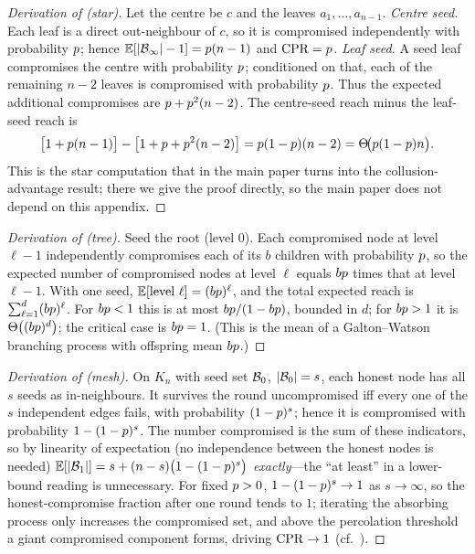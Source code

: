 \begin{proof}[Derivation of  (star)]
Let the centre be $c$ and the leaves $a_1,\dots,a_{n-1}$.
\emph{Centre seed.} Each leaf is a direct out-neighbour of $c$, so it is compromised
independently with probability $p$; hence $\mathbb{E}[|\mathcal{B}_\infty|-1]=p(n-1)$ and
$\mathrm{CPR}=p$.
\emph{Leaf seed.} A seed leaf compromises the centre with probability $p$; conditioned
on that, each of the remaining $n-2$ leaves is compromised with probability $p$. Thus
the expected additional compromises are $p+p^{2}(n-2)$. The centre-seed reach minus
the leaf-seed reach is
\[
\bigl[1+p(n-1)\bigr]-\bigl[1+p+p^{2}(n-2)\bigr]
=p(1-p)(n-2)=\Theta\!\bigl(p(1-p)n\bigr).
\]
This is the star computation that  in the main paper turns into the
collusion-advantage result; there we give the proof directly, so the main paper does not
depend on this appendix.
\end{proof}

\begin{proof}[Derivation of  (tree)]
Seed the root (level $0$). Each compromised node at level $\ell-1$ independently
compromises each of its $b$ children with probability $p$, so the expected number of
compromised nodes at level $\ell$ equals $bp$ times that at level $\ell-1$. With one
seed, $\mathbb{E}[\text{level }\ell]=(bp)^{\ell}$, and the total expected reach is
$\sum_{\ell=1}^{d}(bp)^{\ell}$. For $bp<1$ this is at most $bp/(1-bp)$,
bounded in $d$; for $bp>1$ it is $\Theta\bigl((bp)^{d}\bigr)$; the critical case is
$bp=1$. (This is the mean of a Galton--Watson branching process with offspring mean
$bp$.)
\end{proof}

\begin{proof}[Derivation of  (mesh)]
On $K_n$ with seed set $\mathcal{B}_0$, $|\mathcal{B}_0|=s$, each honest node has all $s$ seeds as
in-neighbours. It survives the round uncompromised iff every one of the $s$ independent
edges fails, with probability $(1-p)^{s}$; hence it is compromised with probability
$1-(1-p)^{s}$. The number compromised is the sum of these indicators, so by linearity
of expectation (no independence between the honest nodes is needed)
$\mathbb{E}[|\mathcal{B}_1|]=s+(n-s)\bigl(1-(1-p)^{s}\bigr)$ \emph{exactly}---the ``at least'' in a
lower-bound reading is unnecessary. For fixed $p>0$,
$1-(1-p)^{s}\to1$ as $s\to\infty$, so the honest-compromise fraction after one round
tends to $1$; iterating the absorbing process only increases the compromised set, and above
the percolation threshold a giant compromised component forms, driving $\mathrm{CPR}\to1$
(cf.~\cite{kempe2003maximizing,watts2002simple}).
\end{proof}


